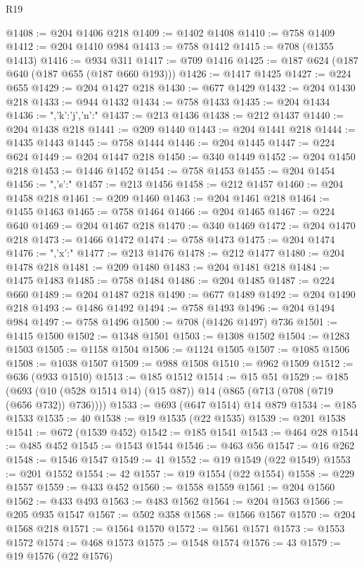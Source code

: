 \begin{lexlean}{R19}
\begin{coremodule}
{{{{{{@1408 := @204 @1406 @218
@1409 := @1402 @1408
@1410 := @758 @1409
@1412 := @204 @1410 @984
@1413 := @758 @1412
@1415 := @708 (@1355 @1413)
@1416 := @934 @311
@1417 := @709 @1416
@1425 := @187 @624 (@187 @640 (@187 @655 (@187 @660 @193)))
@1426 := @1417 @1425
@1427 := @224 @655
@1429 := @204 @1427 @218
@1430 := @677 @1429
@1432 := @204 @1430 @218
@1433 := @944 @1432
@1434 := @758 @1433
@1435 := @204 @1434
@1436 := ",'k':'j','n':"
@1437 := @213 @1436
@1438 := @212 @1437
@1440 := @204 @1438 @218
@1441 := @209 @1440
@1443 := @204 @1441 @218
@1444 := @1435 @1443
@1445 := @758 @1444
@1446 := @204 @1445
@1447 := @224 @624
@1449 := @204 @1447 @218
@1450 := @340 @1449
@1452 := @204 @1450 @218
@1453 := @1446 @1452
@1454 := @758 @1453
@1455 := @204 @1454
@1456 := ",'s':"
@1457 := @213 @1456
@1458 := @212 @1457
@1460 := @204 @1458 @218
@1461 := @209 @1460
@1463 := @204 @1461 @218
@1464 := @1455 @1463
@1465 := @758 @1464
@1466 := @204 @1465
@1467 := @224 @640
@1469 := @204 @1467 @218
@1470 := @340 @1469
@1472 := @204 @1470 @218
@1473 := @1466 @1472
@1474 := @758 @1473
@1475 := @204 @1474
@1476 := ",'x':"
@1477 := @213 @1476
@1478 := @212 @1477
@1480 := @204 @1478 @218
@1481 := @209 @1480
@1483 := @204 @1481 @218
@1484 := @1475 @1483
@1485 := @758 @1484
@1486 := @204 @1485
@1487 := @224 @660
@1489 := @204 @1487 @218
@1490 := @677 @1489
@1492 := @204 @1490 @218
@1493 := @1486 @1492
@1494 := @758 @1493
@1496 := @204 @1494 @984
@1497 := @758 @1496
@1500 := @708 (@1426 @1497) @736
@1501 := @1415 @1500
@1502 := @1348 @1501
@1503 := @1308 @1502
@1504 := @1283 @1503
@1505 := @1158 @1504
@1506 := @1124 @1505
@1507 := @1085 @1506
@1508 := @1038 @1507
@1509 := @988 @1508
@1510 := @962 @1509
@1512 := @636 (@933 @1510)
@1513 := @185 @1512
@1514 := @15 @51
@1529 := @185
    (@693 (@10 (@528 @1514 @14) (@15 @87)) @14 (@865 (@713 (@708 (@719 (@656 @732)) @736))))
@1533 := @693 (@647 @1514) @14 @879
@1534 := @185 @1533
@1535 := 40
@1538 := @19 @1535 (@22 @1535)
@1539 := @201 @1538
@1541 := @672 (@1539 @452)
@1542 := @185 @1541
@1543 := @464 @28
@1544 := @485 @452
@1545 := @1543 @1544
@1546 := @463 @56
@1547 := @16 @262
@1548 := @1546 @1547
@1549 := 41
@1552 := @19 @1549 (@22 @1549)
@1553 := @201 @1552
@1554 := 42
@1557 := @19 @1554 (@22 @1554)
@1558 := @229 @1557
@1559 := @433 @452
@1560 := @1558 @1559
@1561 := @204 @1560
@1562 := @433 @493
@1563 := @483 @1562
@1564 := @204 @1563
@1566 := @205 @935 @1547
@1567 := @502 @358
@1568 := @1566 @1567
@1570 := @204 @1568 @218
@1571 := @1564 @1570
@1572 := @1561 @1571
@1573 := @1553 @1572
@1574 := @468 @1573
@1575 := @1548 @1574
@1576 := 43
@1579 := @19 @1576 (@22 @1576)
}}}}}}
\end{coremodule}
\end{lexlean}
